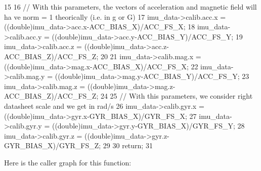 \begin{DoxyCode}
15 {
16   // With this parameters, the vectors of acceleration and magnetic field will ha
      ve norm = 1 theorically (i.e. in g or G)
17   imu_data->calib.acc.x = ((double)imu_data->acc.x-ACC_BIAS_X)/ACC_FS_X;
18   imu_data->calib.acc.y = ((double)imu_data->acc.y-ACC_BIAS_Y)/ACC_FS_Y;
19   imu_data->calib.acc.z = ((double)imu_data->acc.z-ACC_BIAS_Z)/ACC_FS_Z;
20   
21   imu_data->calib.mag.x = ((double)imu_data->mag.x-ACC_BIAS_X)/ACC_FS_X;
22   imu_data->calib.mag.y = ((double)imu_data->mag.y-ACC_BIAS_Y)/ACC_FS_Y;
23   imu_data->calib.mag.z = ((double)imu_data->mag.z-ACC_BIAS_Z)/ACC_FS_Z;
24   
25   // With this parameters, we consider right datasheet scale and we get in rad/s
26   imu_data->calib.gyr.x = ((double)imu_data->gyr.x-GYR_BIAS_X)/GYR_FS_X;
27   imu_data->calib.gyr.y = ((double)imu_data->gyr.y-GYR_BIAS_X)/GYR_FS_Y;
28   imu_data->calib.gyr.z = ((double)imu_data->gyr.z-GYR_BIAS_X)/GYR_FS_Z;
29   
30   return;
31 }
\end{DoxyCode}




Here is the caller graph for this function:

